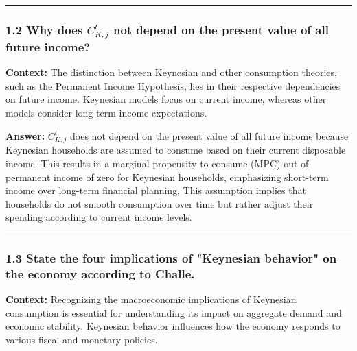 \documentclass{article}
\begin{document}
\noindent\rule{\linewidth}{0.5pt}

\subsubsection*{1.2 Why does \( C_{K,j}^t \) not depend on the present value of all future income?}

\textbf{Context:} The distinction between Keynesian and other consumption theories, such as the Permanent Income Hypothesis, lies in their respective dependencies on future income. Keynesian models focus on current income, whereas other models consider long-term income expectations.

\textbf{Answer:} 
\( C_{K,j}^t \) does not depend on the present value of all future income because Keynesian households are assumed to consume based on their current disposable income. This results in a marginal propensity to consume (MPC) out of permanent income of zero for Keynesian households, emphasizing short-term income over long-term financial planning. This assumption implies that households do not smooth consumption over time but rather adjust their spending according to current income levels.

\noindent\rule{\linewidth}{0.5pt}

\subsubsection*{1.3 State the four implications of "Keynesian behavior" on the economy according to Challe.}

\textbf{Context:} Recognizing the macroeconomic implications of Keynesian consumption is essential for understanding its impact on aggregate demand and economic stability. Keynesian behavior influences how the economy responds to various fiscal and monetary policies.
\end{document}
